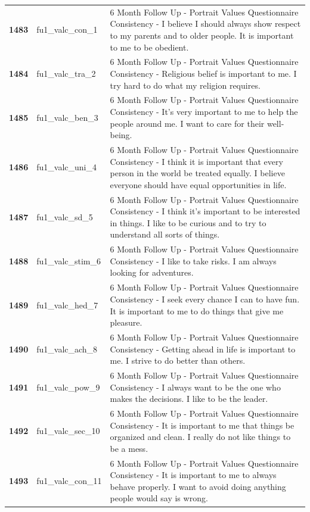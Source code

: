 \documentclass[
  letterpaper,
  DIV=11,
  numbers=noendperiod]{scrartcl}
\begin{document}
\begin{longtable}[t]{>{}cll}
\textbf{1483} & fu1\_valc\_con\_1 & 6 Month Follow Up - Portrait Values Questionnaire Consistency - I believe I should always show respect to my parents and to older people. It is important to me to be obedient.\\
\textbf{1484} & fu1\_valc\_tra\_2 & 6 Month Follow Up - Portrait Values Questionnaire Consistency - Religious belief is important to me. I try hard to do what my religion requires.\\
\textbf{1485} & fu1\_valc\_ben\_3 & 6 Month Follow Up - Portrait Values Questionnaire Consistency - It's very important to me to help the people around me. I want to care for their well-being.\\
\addlinespace
\textbf{1486} & fu1\_valc\_uni\_4 & 6 Month Follow Up - Portrait Values Questionnaire Consistency - I think it is important that every person in the world be treated equally. I believe everyone should have equal opportunities in life.\\
\textbf{1487} & fu1\_valc\_sd\_5 & 6 Month Follow Up - Portrait Values Questionnaire Consistency - I think it's important to be interested in things. I like to be curious and to try to understand all sorts of things.\\
\textbf{1488} & fu1\_valc\_stim\_6 & 6 Month Follow Up - Portrait Values Questionnaire Consistency - I like to take risks. I am always looking for adventures.\\
\textbf{1489} & fu1\_valc\_hed\_7 & 6 Month Follow Up - Portrait Values Questionnaire Consistency - I seek every chance I can to have fun. It is important to me to do things that give me pleasure.\\
\textbf{1490} & fu1\_valc\_ach\_8 & 6 Month Follow Up - Portrait Values Questionnaire Consistency - Getting ahead in life is important to me. I strive to do better than others.\\
\addlinespace
\textbf{1491} & fu1\_valc\_pow\_9 & 6 Month Follow Up - Portrait Values Questionnaire Consistency - I always want to be the one who makes the decisions. I like to be the leader.\\
\textbf{1492} & fu1\_valc\_sec\_10 & 6 Month Follow Up - Portrait Values Questionnaire Consistency - It is important to me that things be organized and clean. I really do not like things to be a mess.\\
\textbf{1493} & fu1\_valc\_con\_11 & 6 Month Follow Up - Portrait Values Questionnaire Consistency - It is important to me to always behave properly. I want to avoid doing anything people would say is wrong.\\

\end{longtable}
\end{document}
